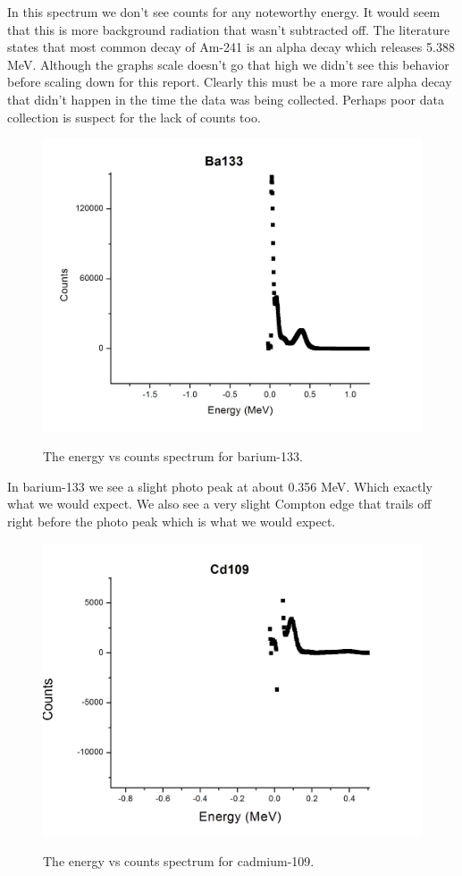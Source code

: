 \documentclass[12pt letterpaper]{article}
\begin{document}
In this spectrum we don't see counts for any noteworthy energy. It would seem that this is more background radiation that wasn't subtracted off. The literature states that most common decay of Am-241 is an alpha decay which releases 5.388 MeV. Although the graphs scale doesn't go that high we didn't see this behavior before scaling down for this report. Clearly this must be a more rare alpha decay that didn't happen in the time the data was being collected. Perhaps poor data collection is suspect for the lack of counts too. 

\begin{figure}[H]
  \caption{The energy vs counts spectrum for barium-133.}
  \centering
    \includegraphics[width=.60\textwidth]{Ba133.JPG}
    \label{fig:ba133}
\end{figure}

In barium-133 we see a slight photo peak at about 0.356 MeV. Which exactly what we would expect. We also see a very slight Compton edge that trails off right before the photo peak which is what we would expect.  


\begin{figure}[H]
  \caption{The energy vs counts spectrum for cadmium-109.}
  \centering
    \includegraphics[width=.60\textwidth]{cd109.JPG}
    \label{fig:cd109}
\end{figure}
\end{document}
